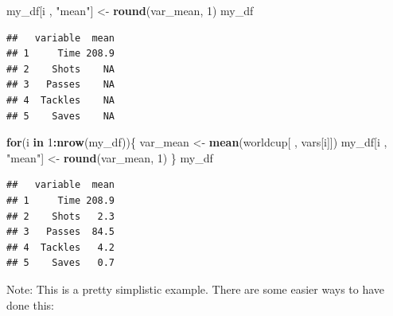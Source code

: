\documentclass[]{book}
\makeatletter
\newenvironment{Shaded}{\begin{snugshade}}{\end{snugshade}}
\newcommand{\KeywordTok}[1]{\textcolor[rgb]{0.13,0.29,0.53}{\textbf{#1}}}
\newcommand{\DataTypeTok}[1]{\textcolor[rgb]{0.13,0.29,0.53}{#1}}
\newcommand{\DecValTok}[1]{\textcolor[rgb]{0.00,0.00,0.81}{#1}}
\newcommand{\StringTok}[1]{\textcolor[rgb]{0.31,0.60,0.02}{#1}}
\newcommand{\ControlFlowTok}[1]{\textcolor[rgb]{0.13,0.29,0.53}{\textbf{#1}}}
\newcommand{\OperatorTok}[1]{\textcolor[rgb]{0.81,0.36,0.00}{\textbf{#1}}}
\newcommand{\NormalTok}[1]{#1}
\newenvironment{kframe}{%
\medskip{}
\setlength{\fboxsep}{.8em}
 \def\at@end@of@kframe{}%
 \ifinner\ifhmode%
  \def\at@end@of@kframe{\end{minipage}}%
  \begin{minipage}{\columnwidth}%
 \fi\fi%
 \def\FrameCommand##1{\hskip\@totalleftmargin \hskip-\fboxsep
 \colorbox{shadecolor}{##1}\hskip-\fboxsep
     \hskip-\linewidth \hskip-\@totalleftmargin \hskip\columnwidth}%
 \MakeFramed {\advance\hsize-\width
   \@totalleftmargin\z@ \linewidth\hsize
   \@setminipage}}%
 {\par\unskip\endMakeFramed%
 \at@end@of@kframe}
\renewenvironment{Shaded}{\begin{kframe}}{\end{kframe}}
\theoremstyle{definition}
\theoremstyle{definition}
\theoremstyle{definition}
\theoremstyle{remark}
\makeatother
\begin{document}
\begin{Shaded}
\begin{Highlighting}[]
\NormalTok{my_df[i , }\StringTok{"mean"}\NormalTok{] <-}\StringTok{ }\KeywordTok{round}\NormalTok{(var_mean, }\DecValTok{1}\NormalTok{)}
\NormalTok{my_df}
\end{Highlighting}
\end{Shaded}

\begin{verbatim}
##   variable  mean
## 1     Time 208.9
## 2    Shots    NA
## 3   Passes    NA
## 4  Tackles    NA
## 5    Saves    NA
\end{verbatim}

\begin{Shaded}
\begin{Highlighting}[]
\ControlFlowTok{for}\NormalTok{(i }\ControlFlowTok{in} \DecValTok{1}\OperatorTok{:}\KeywordTok{nrow}\NormalTok{(my_df))\{}
\NormalTok{        var_mean <-}\StringTok{ }\KeywordTok{mean}\NormalTok{(worldcup[ , vars[i]])}
\NormalTok{        my_df[i , }\StringTok{"mean"}\NormalTok{] <-}\StringTok{ }\KeywordTok{round}\NormalTok{(var_mean, }\DecValTok{1}\NormalTok{)}
\NormalTok{\}}
\NormalTok{my_df}
\end{Highlighting}
\end{Shaded}

\begin{verbatim}
##   variable  mean
## 1     Time 208.9
## 2    Shots   2.3
## 3   Passes  84.5
## 4  Tackles   4.2
## 5    Saves   0.7
\end{verbatim}

Note: This is a pretty simplistic example. There are some easier ways to
have done this:

\begin{Shaded}
\end{Shaded}
\end{document}
